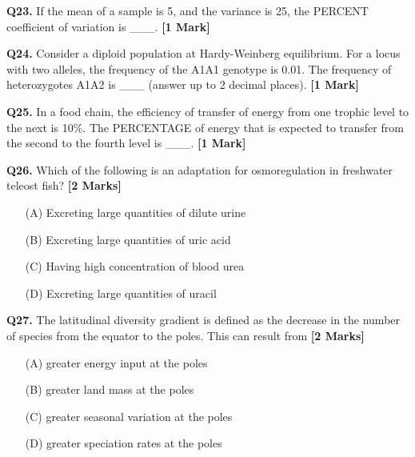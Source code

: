 \documentclass[11pt]{article}
\newcommand{\questiona}[2]{
    \noindent\textbf{Q#2.} #1 \hfill \textbf{[1 Mark]}
}
\newcommand{\questionb}[2]{
    \noindent\textbf{Q#2.} #1 \hfill \textbf{[2 Marks]}
}
\begin{document}
\questiona{If the mean of a sample is 5, and the variance is 25, the PERCENT coefficient of variation is \_\_\_.}{23}
\vspace{0.5cm}

\questiona{Consider a diploid population at Hardy-Weinberg equilibrium. For a locus with two alleles, the frequency of the A1A1 genotype is 0.01. The frequency of heterozygotes A1A2 is \_\_\_ (answer up to 2 decimal places).}{24}
\vspace{0.5cm}

\questiona{In a food chain, the efficiency of transfer of energy from one trophic level to the next is 10\%. The PERCENTAGE of energy that is expected to transfer from the second to the fourth level is \_\_\_.}{25}
\vspace{0.5cm}

\questionb{Which of the following is an adaptation for osmoregulation in freshwater teleost fish?}{26}
\begin{enumerate}
    \item[(A)] Excreting large quantities of dilute urine
    \item[(B)] Excreting large quantities of uric acid
    \item[(C)] Having high concentration of blood urea
    \item[(D)] Excreting large quantities of uracil
\end{enumerate}
\vspace{0.5cm}

\questionb{The latitudinal diversity gradient is defined as the decrease in the number of species from the equator to the poles. This can result from}{27}
\begin{enumerate}
    \item[(A)] greater energy input at the poles
    \item[(B)] greater land mass at the poles
    \item[(C)] greater seasonal variation at the poles
    \item[(D)] greater speciation rates at the poles
\end{enumerate}
\vspace{0.5cm}
\end{document}
